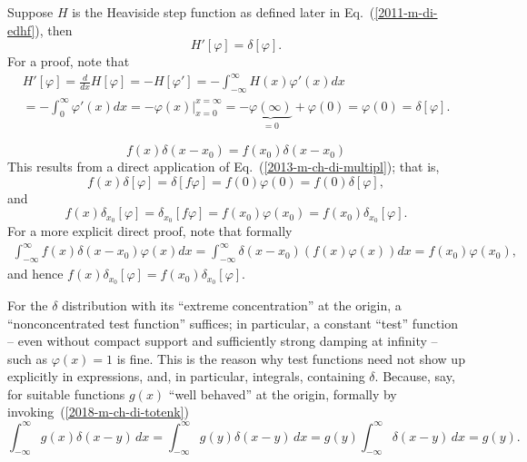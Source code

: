 Suppose $H$ is the
{Heaviside step function}
as defined later in Eq.~(\ref{2011-m-di-edhf}), then
 \begin{equation}
H' [\varphi] =\delta[\varphi]
.
\end{equation}
{\color{OliveGreen}
\bproof
For a proof, note that
 \begin{equation}
 \begin{split}
H'[\varphi] =\frac{d}{dx}H[\varphi ] = -H[\varphi']=
-\int_{-\infty}^\infty H (x)  \varphi'(x) dx
\\
=
-\int_{0}^\infty   \varphi'(x) dx
=
-\left. \varphi (x) \right|_{x=0}^{x=\infty} =   - \underbrace{\varphi (\infty )}_{=0} +\varphi (0)= \varphi (0) =\delta[\varphi ]
.
 \end{split}
 \end{equation}
\eproof
}


 \begin{equation}
 f (x)\delta (x-x_0)
 =
f (x_0)\delta (x-x_0)
\label{2018-m-ch-di-totenk}
 \end{equation}
{\color{OliveGreen}
\bproof
This results from a direct application of Eq.~(\ref{2013-m-ch-di-multipl}); that is,
 \begin{equation}
f(x) \delta
[\varphi ]
=
\delta
\left[  f  \varphi \right]
=
f(0)\varphi(0) = f(0)   \delta
[\varphi ]
,
 \end{equation}
and
 \begin{equation}
f(x) \delta_{x_0}
[\varphi ]
=
\delta_{x_0}
\left[  f  \varphi \right]
=
f({x_0})\varphi({x_0}) = f({x_0})   \delta_{x_0}
[\varphi ]
.
 \end{equation}
For a more explicit direct proof, note that formally
 \begin{equation}
 \begin{split}
\int _{-\infty}^\infty f (x)\delta (x-x_0)  \varphi(x) dx
=
\int _{-\infty}^\infty\delta (x-x_0)  ( f (x)\varphi(x) ) dx = f(x_0) \varphi(x_0)
,
 \end{split}
 \end{equation}
and hence $f(x) \delta_{x_0}[ \varphi ] =   f(x_0)\delta_{x_0}[ \varphi ]$.
\eproof
}

For the $\delta$ distribution with its ``extreme concentration'' at the origin, a ``nonconcentrated test function'' suffices; in particular, a constant ``test'' function
-- even without compact support and sufficiently strong damping at infinity --
such as $\varphi (x) = 1$ is fine.
This is the reason why test functions need not show up explicitly in expressions, and, in particular, integrals, containing $\delta$.
Because, say, for suitable functions $g(x)$ ``well behaved'' at the origin, formally by invoking~(\ref{2018-m-ch-di-totenk})
 \begin{equation}
\int_{-\infty}^{\infty} g(x)\delta(x-y) \,dx =
\int_{-\infty}^{\infty} g(y)\delta(x-y) \,dx =
g(y)\int_{-\infty}^{\infty} \delta(x-y)  \,dx =g(y).
\end{equation}

